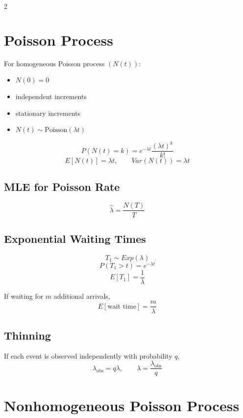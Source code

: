 \documentclass[10pt]{article}
\begin{document}
\begin{multicols}{2}
\section{Poisson Process}

\begin{definitionbox}
For homogeneous Poisson process \((N(t))\):
\begin{itemize}[leftmargin=12pt,itemsep=1pt]
\item \(N(0)=0\)
\item independent increments
\item stationary increments
\item \(N(t)\sim \text{Poisson}(\lambda t)\)
\end{itemize}
\end{definitionbox}

\begin{formulabox}
\[
P(N(t)=k)=e^{-\lambda t}\frac{(\lambda t)^k}{k!}
\]
\[
E[N(t)]=\lambda t,\qquad Var(N(t))=\lambda t
\]
\end{formulabox}

\subsection{MLE for Poisson Rate}

\begin{formulabox}
\[
\hat\lambda=\frac{N(T)}{T}
\]
\end{formulabox}

\subsection{Exponential Waiting Times}

\[
T_1\sim Exp(\lambda)
\]
\[
P(T_1>t)=e^{-\lambda t}
\]
\[
E[T_1]=\frac{1}{\lambda}
\]

If waiting for \(m\) additional arrivals,
\[
E[\text{wait time}]=\frac{m}{\lambda}
\]

\subsection{Thinning}

If each event is observed independently with probability \(q\),
\[
\lambda_{\text{obs}}=q\lambda,\qquad \lambda=\frac{\lambda_{\text{obs}}}{q}
\]

\section{Nonhomogeneous Poisson Process}


\end{multicols}
\end{document}
